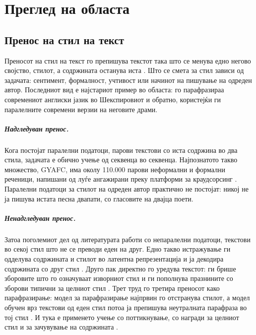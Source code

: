\chapter{Преглед на областа}\label{ch:background}

\section{Пренос на стил на текст}

Преносот на стил на текст го препишува текстот така што се менува едно
негово својство, стилот, а содржината останува иста \citep{jin2022survey}.
Што се смета за стил зависи од задачата: сентимент, формалност,
учтивост или начинот на пишување на одреден автор. Последниот вид е
најстариот пример во областа: \citet{xu2012shakespeare} го парафразираа
современиот англиски јазик во Шекспировиот и обратно, користејќи ги
паралелните современи верзии на неговите драми.

\paragraph{Надгледуван пренос.} Кога постојат паралелни податоци, парови
текстови со иста содржина во два стила, задачата е обично учење од
секвенца во секвенца. Најпознатото такво множество, GYAFC, има околу
110.000 парови неформални и формални реченици, напишани од луѓе ангажирани
преку платформи за краудсорсинг \citep{rao2018gyafc}. Паралелни податоци
за стилот на одреден автор практично не постојат: никој не ја пишува истата
песна двапати, со гласовите на двајца поети.

\paragraph{Ненадгледуван пренос.} Затоа поголемиот дел од литературата
работи со непаралелни податоци, текстови во секој стил што не се преводи
еден на друг. Едно такво истражување ги одделува содржината и стилот во
латентна репрезентација и ја декодира содржината со друг стил
\citep{shen2017crossalign}. Друго пак директно го уредува текстот: ги брише
зборовите што го означуваат изворниот стил и ги пополнува празнините со
зборови типични за целниот стил \citep{li2018delete}. Трет труд го третира
преносот како парафразирање: модел за парафразирање најпрвин го
отстранува стилот, а модел обучен врз текстови од еден стил потоа ја
препишува неутралната парафраза во тој стил \citep{krishna2020strap}. И
тука е применето учење со поттикнување, со награди за целниот стил и за
зачувување на содржината \citep{luo2019dualrl}.

